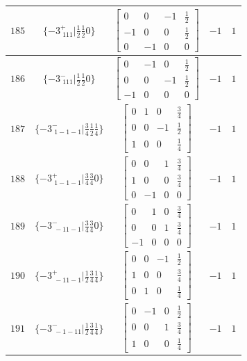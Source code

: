 \documentclass[fleqn,8pt]{jsarticle}
\begin{document}
\begin{longtable}{ccccc}
$ 185 $ & $ \{-3^{+}_{\,\,111}|\frac{1}{2} \frac{1}{2} 0\} $ & $ \begin{bmatrix} 0 & 0 & -1 & \frac{1}{2} \\ -1 & 0 & 0 & \frac{1}{2} \\ 0 & -1 & 0 & 0 \end{bmatrix} $ & $ -1 $ & $ 1 $ \\ \hline
$ 186 $ & $ \{-3^{-}_{\,\,111}|\frac{1}{2} \frac{1}{2} 0\} $ & $ \begin{bmatrix} 0 & -1 & 0 & \frac{1}{2} \\ 0 & 0 & -1 & \frac{1}{2} \\ -1 & 0 & 0 & 0 \end{bmatrix} $ & $ -1 $ & $ 1 $ \\ \hline
$ 187 $ & $ \{-3^{-}_{\,\,1-1-1}|\frac{3}{4} \frac{1}{2} \frac{1}{4}\} $ & $ \begin{bmatrix} 0 & 1 & 0 & \frac{3}{4} \\ 0 & 0 & -1 & \frac{1}{2} \\ 1 & 0 & 0 & \frac{1}{4} \end{bmatrix} $ & $ -1 $ & $ 1 $ \\ \hline
$ 188 $ & $ \{-3^{+}_{\,\,1-1-1}|\frac{3}{4} \frac{3}{4} 0\} $ & $ \begin{bmatrix} 0 & 0 & 1 & \frac{3}{4} \\ 1 & 0 & 0 & \frac{3}{4} \\ 0 & -1 & 0 & 0 \end{bmatrix} $ & $ -1 $ & $ 1 $ \\ \hline
$ 189 $ & $ \{-3^{-}_{\,\,-11-1}|\frac{3}{4} \frac{3}{4} 0\} $ & $ \begin{bmatrix} 0 & 1 & 0 & \frac{3}{4} \\ 0 & 0 & 1 & \frac{3}{4} \\ -1 & 0 & 0 & 0 \end{bmatrix} $ & $ -1 $ & $ 1 $ \\ \hline
$ 190 $ & $ \{-3^{+}_{\,\,-11-1}|\frac{1}{2} \frac{3}{4} \frac{1}{4}\} $ & $ \begin{bmatrix} 0 & 0 & -1 & \frac{1}{2} \\ 1 & 0 & 0 & \frac{3}{4} \\ 0 & 1 & 0 & \frac{1}{4} \end{bmatrix} $ & $ -1 $ & $ 1 $ \\ \hline
$ 191 $ & $ \{-3^{-}_{\,\,-1-11}|\frac{1}{2} \frac{3}{4} \frac{1}{4}\} $ & $ \begin{bmatrix} 0 & -1 & 0 & \frac{1}{2} \\ 0 & 0 & 1 & \frac{3}{4} \\ 1 & 0 & 0 & \frac{1}{4} \end{bmatrix} $ & $ -1 $ & $ 1 $ \\ \hline

\end{longtable}
\end{document}
